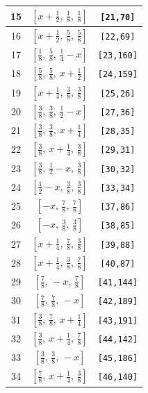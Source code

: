 \documentclass[fleqn,8pt]{jsarticle}
\begin{document}
\begin{longtable}{ccc}
15 & $\left[ x + \frac{1}{2},\, \frac{1}{8},\, \frac{1}{8} \right]$ & {\tt [21,70]} \\ \hline
16 & $\left[ x + \frac{1}{2},\, \frac{5}{8},\, \frac{5}{8} \right]$ & {\tt [22,69]} \\ \hline
17 & $\left[ \frac{1}{8},\, \frac{5}{8},\, \frac{1}{4} - x \right]$ & {\tt [23,160]} \\ \hline
18 & $\left[ \frac{5}{8},\, \frac{5}{8},\, x + \frac{1}{2} \right]$ & {\tt [24,159]} \\ \hline
19 & $\left[ x + \frac{1}{4},\, \frac{3}{8},\, \frac{3}{8} \right]$ & {\tt [25,26]} \\ \hline
20 & $\left[ \frac{3}{8},\, \frac{3}{8},\, \frac{1}{2} - x \right]$ & {\tt [27,36]} \\ \hline
21 & $\left[ \frac{3}{8},\, \frac{3}{8},\, x + \frac{1}{4} \right]$ & {\tt [28,35]} \\ \hline
22 & $\left[ \frac{3}{8},\, x + \frac{1}{4},\, \frac{3}{8} \right]$ & {\tt [29,31]} \\ \hline
23 & $\left[ \frac{3}{8},\, \frac{1}{2} - x,\, \frac{3}{8} \right]$ & {\tt [30,32]} \\ \hline
24 & $\left[ \frac{1}{2} - x,\, \frac{3}{8},\, \frac{3}{8} \right]$ & {\tt [33,34]} \\ \hline
25 & $\left[ - x,\, \frac{7}{8},\, \frac{7}{8} \right]$ & {\tt [37,86]} \\ \hline
26 & $\left[ - x,\, \frac{3}{8},\, \frac{3}{8} \right]$ & {\tt [38,85]} \\ \hline
27 & $\left[ x + \frac{1}{4},\, \frac{7}{8},\, \frac{3}{8} \right]$ & {\tt [39,88]} \\ \hline
28 & $\left[ x + \frac{1}{4},\, \frac{3}{8},\, \frac{7}{8} \right]$ & {\tt [40,87]} \\ \hline
29 & $\left[ \frac{7}{8},\, - x,\, \frac{7}{8} \right]$ & {\tt [41,144]} \\ \hline
30 & $\left[ \frac{7}{8},\, \frac{7}{8},\, - x \right]$ & {\tt [42,189]} \\ \hline
31 & $\left[ \frac{3}{8},\, \frac{7}{8},\, x + \frac{1}{4} \right]$ & {\tt [43,191]} \\ \hline
32 & $\left[ \frac{3}{8},\, x + \frac{1}{4},\, \frac{7}{8} \right]$ & {\tt [44,142]} \\ \hline
33 & $\left[ \frac{3}{8},\, \frac{3}{8},\, - x \right]$ & {\tt [45,186]} \\ \hline
34 & $\left[ \frac{7}{8},\, x + \frac{1}{4},\, \frac{3}{8} \right]$ & {\tt [46,140]} \\ \hline

\end{longtable}
\end{document}
